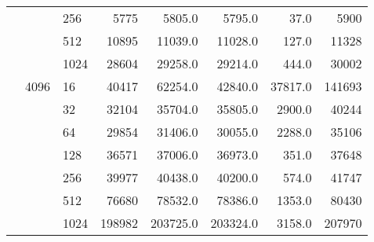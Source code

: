 \begin{tabular}{lllrrrrr}
         &      & 256  &                 5775 &    5805.0 &    5795.0 &     37.0 &    5900 \\
         &      & 512  &                10895 &   11039.0 &   11028.0 &    127.0 &   11328 \\
         &      & 1024 &                28604 &   29258.0 &   29214.0 &    444.0 &   30002 \\
         & 4096 & 16   &                40417 &   62254.0 &   42840.0 &  37817.0 &  141693 \\
         &      & 32   &                32104 &   35704.0 &   35805.0 &   2900.0 &   40244 \\
         &      & 64   &                29854 &   31406.0 &   30055.0 &   2288.0 &   35106 \\
         &      & 128  &                36571 &   37006.0 &   36973.0 &    351.0 &   37648 \\
         &      & 256  &                39977 &   40438.0 &   40200.0 &    574.0 &   41747 \\
         &      & 512  &                76680 &   78532.0 &   78386.0 &   1353.0 &   80430 \\
         &      & 1024 &               198982 &  203725.0 &  203324.0 &   3158.0 &  207970 \\
\bottomrule
\end{tabular}
